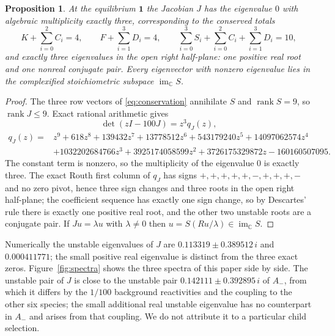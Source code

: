 \documentclass[11pt,a4paper]{article}
\theoremstyle{plain}
\newtheorem{proposition}[theorem]{Proposition}
\theoremstyle{definition}
\theoremstyle{remark}
\newcommand{\C}{\mathbb C}
\newcommand{\Aminus}{A_{-}}
\DeclareMathOperator{\im}{im}
\DeclareMathOperator{\rank}{rank}
\begin{document}
\begin{proposition}\label{prop:kinetic}
At the equilibrium $\mathbf1$ the Jacobian $J$ has the eigenvalue $0$ with algebraic multiplicity exactly three, corresponding to the conserved totals
\begin{equation}\label{eq:conservation}
K+\sum_{i=0}^2C_i=4,\qquad F+\sum_{i=1}^3D_i=4,\qquad \sum_{i=0}^3S_i+\sum_{i=0}^2C_i+\sum_{i=1}^3D_i=10,
\end{equation}
and exactly three eigenvalues in the open right half-plane: one positive real root and one nonreal conjugate pair. Every eigenvector with nonzero eigenvalue lies in the complexified stoichiometric subspace $\im_\C S$.
\end{proposition}
\begin{proof}
The three row vectors of \eqref{eq:conservation} annihilate $S$ and $\rank S=9$, so $\rank J\le9$. Exact rational arithmetic gives
\begin{equation}\label{eq:Jpoly}
\det(zI-100J)=z^3q_J(z),
\end{equation}
\begin{align*}
q_J(z)={}&z^9+618z^8+139432z^7+13778512z^6+543179240z^5+14097062574z^4\\
&+1032202684766z^3+3925174058599z^2+3726175329872z-160160507095 .
\end{align*}
The constant term is nonzero, so the multiplicity of the eigenvalue $0$ is exactly three. The exact Routh first column of $q_J$ has signs $+,+,+,+,+,-,+,+,+,-$ and no zero pivot, hence three sign changes and three roots in the open right half-plane; the coefficient sequence has exactly one sign change, so by Descartes' rule there is exactly one positive real root, and the other two unstable roots are a conjugate pair. If $Ju=\lambda u$ with $\lambda\ne0$ then $u=S(Ru/\lambda)\in\im_\C S$.
\end{proof}

Numerically the unstable eigenvalues of $J$ are $0.113319\pm0.389512\,i$ and $0.000411771$; the small positive real eigenvalue is distinct from the three exact zeros. Figure~\ref{fig:spectra} shows the three spectra of this paper side by side. The unstable pair of $J$ is close to the unstable pair $0.142111\pm0.392895\,i$ of $\Aminus$, from which it differs by the $1/100$ background reactivities and the coupling to the other six species; the small additional real unstable eigenvalue has no counterpart in $\Aminus$ and arises from that coupling. We do not attribute it to a particular child selection.
\end{document}
